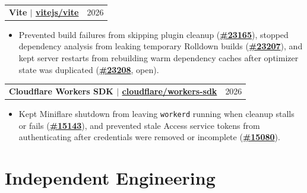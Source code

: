 \documentclass[letterpaper,11pt]{article}
\makeatletter
\newcommand{\resumeHeadingSimple}[2]{%
  \begin{tabularx}{\textwidth}{@{}Xr@{}}
    \textbf{#1} & #2
  \end{tabularx}\vspace{-0.25pt}
}
\newcommand{\resumeItemListStart}{\begin{itemize}[leftmargin=0.23in,itemsep=1.2pt,parsep=0pt,topsep=1.0pt]}
\newcommand{\resumeItem}[1]{\item\fontsize{10.6pt}{12.2pt}\selectfont #1}
\newcommand{\resumeItemListEnd}{\end{itemize}\vspace{-0.25pt}}
\makeatother
\begin{document}
\resumeHeadingSimple
  {Vite $|$ \href{https://redirect.github.com/vitejs/vite}{vitejs/vite}}
  {2026}
\resumeItemListStart
  \resumeItem{Prevented build failures from skipping plugin cleanup (\href{https://redirect.github.com/vitejs/vite/pull/23165}{\textbf{\#23165}}), stopped dependency analysis from leaking temporary Rolldown builds (\href{https://redirect.github.com/vitejs/vite/pull/23207}{\textbf{\#23207}}), and kept server restarts from rebuilding warm dependency caches after optimizer state was duplicated (\href{https://redirect.github.com/vitejs/vite/pull/23208}{\textbf{\#23208}}, open).}
\resumeItemListEnd

\resumeHeadingSimple
  {Cloudflare Workers SDK $|$ \href{https://redirect.github.com/cloudflare/workers-sdk}{cloudflare/workers-sdk}}
  {2026}
\resumeItemListStart
  \resumeItem{Kept Miniflare shutdown from leaving \texttt{workerd} running when cleanup stalls or fails (\href{https://redirect.github.com/cloudflare/workers-sdk/pull/15143}{\textbf{\#15143}}), and prevented stale Access service tokens from authenticating after credentials were removed or incomplete (\href{https://redirect.github.com/cloudflare/workers-sdk/pull/15080}{\textbf{\#15080}}).}
\resumeItemListEnd

\section{Independent Engineering}
\end{document}
